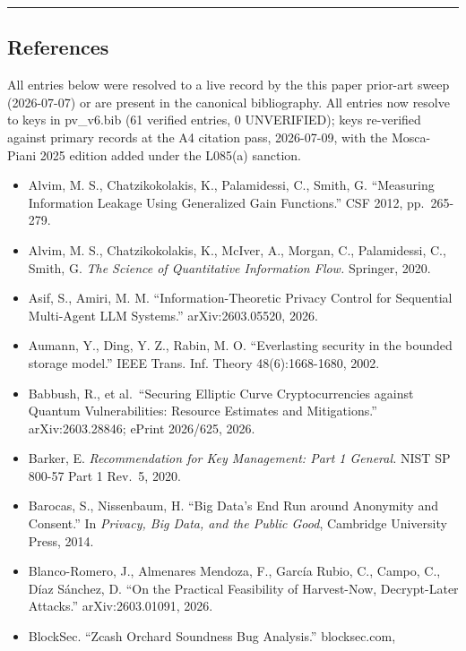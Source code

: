 \documentclass[
]{llncs}
\providecommand{\tightlist}{%
  \setlength{\itemsep}{0pt}\setlength{\parskip}{0pt}}
\begin{document}
\begin{center}\rule{0.5\linewidth}{0.5pt}\end{center}

\subsection{References}\label{references}

All entries below were resolved to a live record by the this paper
prior-art sweep (2026-07-07) or are present in the canonical
bibliography. All entries now resolve to keys in pv\_v6.bib (61 verified
entries, 0 UNVERIFIED); keys re-verified against primary records at the
A4 citation pass, 2026-07-09, with the Mosca-Piani 2025 edition added
under the L085(a) sanction.

\begin{itemize}
\tightlist
\item
  Alvim, M. S., Chatzikokolakis, K., Palamidessi, C., Smith, G.
  ``Measuring Information Leakage Using Generalized Gain Functions.''
  CSF 2012, pp.~265-279.
\item
  Alvim, M. S., Chatzikokolakis, K., McIver, A., Morgan, C.,
  Palamidessi, C., Smith, G. \emph{The Science of Quantitative
  Information Flow.} Springer, 2020.
\item
  Asif, S., Amiri, M. M. ``Information-Theoretic Privacy Control for
  Sequential Multi-Agent LLM Systems.'' arXiv:2603.05520, 2026.
\item
  Aumann, Y., Ding, Y. Z., Rabin, M. O. ``Everlasting security in the
  bounded storage model.'' IEEE Trans. Inf. Theory 48(6):1668-1680,
  2002.
\item
  Babbush, R., et al.~``Securing Elliptic Curve Cryptocurrencies against
  Quantum Vulnerabilities: Resource Estimates and Mitigations.''
  arXiv:2603.28846; ePrint 2026/625, 2026.
\item
  Barker, E. \emph{Recommendation for Key Management: Part 1 General.}
  NIST SP 800-57 Part 1 Rev.~5, 2020.
\item
  Barocas, S., Nissenbaum, H. ``Big Data's End Run around Anonymity and
  Consent.'' In \emph{Privacy, Big Data, and the Public Good}, Cambridge
  University Press, 2014.
\item
  Blanco-Romero, J., Almenares Mendoza, F., García Rubio, C., Campo, C.,
  Díaz Sánchez, D. ``On the Practical Feasibility of Harvest-Now,
  Decrypt-Later Attacks.'' arXiv:2603.01091, 2026.
\item
  BlockSec. ``Zcash Orchard Soundness Bug Analysis.'' blocksec.com,

\end{itemize}
\end{document}
